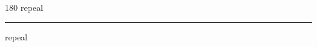 
\begin{frame}
\begin{center}
\begin{turn}{180}
{\fontsize{2.5cm}{1em}\selectfont repeal}
\end{turn}
\vspace{1em}\par  
\hrule
\vspace{1em}\par  
{\fontsize{2.5cm}{1em}\selectfont repeal}
\end{center}
\end{frame}
